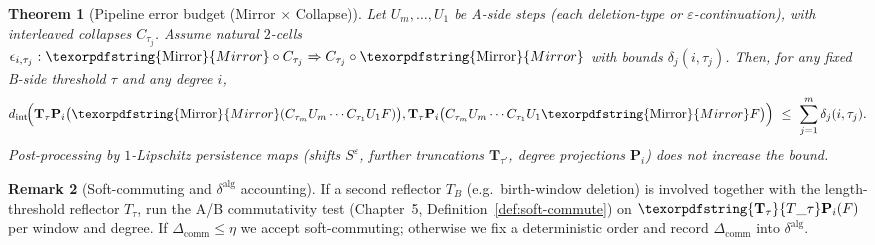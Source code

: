 \documentclass[11pt]{article}
\DeclareRobustCommand{\hyp}{\nobreakdash-}
\numberwithin{equation}{section}
\newtheorem{theorem}{Theorem}[section]
\theoremstyle{definition}
\newtheorem{remark}[theorem]{Remark}
\DeclareRobustCommand{\Ttau}{\texorpdfstring{\ensuremath{\mathbf{T}_{\tau}}}{T\_\tau}}
\DeclareRobustCommand{\Mirror}{\texorpdfstring{\ensuremath{\operatorname{Mirror}}}{Mirror}}
\providecommand{\n}{\unskip\space}
\begin{document}
\begin{theorem}[Pipeline error budget (Mirror $\times$ Collapse)]\label{thm:pipe-budget-8}
Let \(U_m,\dots,U_1\) be A\hyp side steps (each deletion\hyp type or \(\varepsilon\)-continuation), with interleaved collapses \(C_{\tau_j}\).
Assume natural $2$-cells \(\epsilon_{i,\tau_j}:\Mirror\circ C_{\tau_j}\Rightarrow C_{\tau_j}\circ \Mirror\) with bounds \(\delta_j(i,\tau_j)\).
Then, for any fixed B\hyp side threshold \(\tau\) and any degree \(i\),
\[
d_{\mathrm{int}}\!\Big(\n\mathbf{T}_\tau \mathbf{P}_i\big(\Mirror(C_{\tau_m}U_m\cdots C_{\tau_1}U_1F)\big),\ \n\mathbf{T}_\tau \mathbf{P}_i\big(C_{\tau_m}U_m\cdots C_{\tau_1}U_1\Mirror F\big)\n\Big)\ \le\ \sum_{j=1}^m \delta_j(i,\tau_j).
\]
Post\hyp processing by $1$-Lipschitz persistence maps (shifts $S^\varepsilon$, further truncations $\mathbf{T}_{\tau'}$, degree projections $\mathbf{P}_i$) does not increase the bound.
\end{theorem}

\begin{remark}[Soft\hyp commuting and $\delta^{\mathrm{alg}}$ accounting]\label{rk:soft-comm-8}
If a second reflector $T_B$ (e.g.\ birth\hyp window deletion) is involved together with the length\hyp threshold reflector $T_\tau$, run the A/B commutativity test (Chapter~5, Definition~\ref{def:soft-commute}) on \(\Ttau\mathbf{P}_i(F)\) per window and degree.
If \(\Delta_{\mathrm{comm}}\le \eta\) we accept soft\hyp commuting; otherwise we fix a deterministic order and record \(\Delta_{\mathrm{comm}}\) into $\delta^{\mathrm{alg}}$.
\end{remark}
\end{document}
